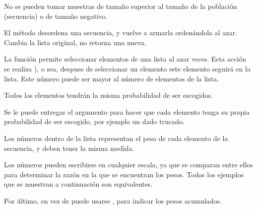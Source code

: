 
No se pueden tomar muestras de tamaño superior al tamaño de la población (secuencia) o de tamaño negativo.



El método  desordena una secuencia, y vuelve a armarla ordenándola al azar. Cambia la lista original, no retorna una nueva.



La función  permite seleccionar elementos de una lista al azar  veces. Esta acción se realiza ), o sea, despues de seleccionar un elemento este elemento seguirá en la lista. Este número puede ser mayor al número de elementos de la lista.


Todos los elementos tendrán la misma probabilidad de ser escogidos.\smallskip

Se le puede entregar el argumento  para hacer que cada elemento tenga su propia probabilidad de ser escogido, por ejemplo un dado trucado.


Los números dentro de la lista  representan el peso de cada elemento de la secuencia, y deben tener la misma medida.\smallskip

Los números pueden escribirse en cualquier escala, ya que se comparan entre ellos para determinar la razón en la que se encuentran los pesos. Todos los ejemplos que se muestran a continuación son equivalentes.


Por último, en vez de  puede usarse , para indicar los pesos acumulados.



